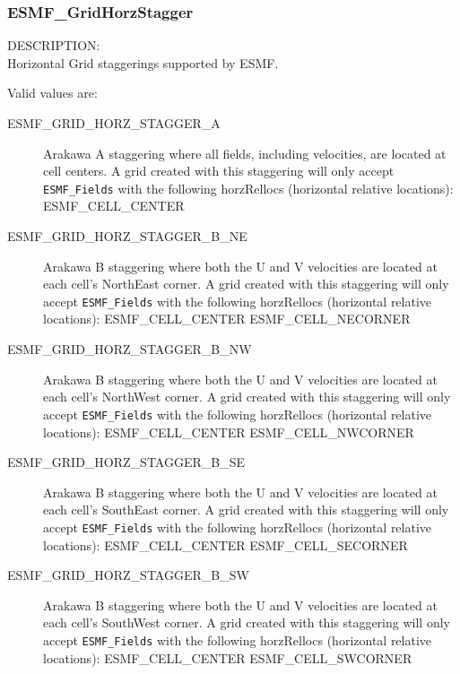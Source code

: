  \subsubsection{ESMF\_GridHorzStagger}

 {\sf DESCRIPTION:\\}
 Horizontal Grid staggerings supported by ESMF.

 Valid values are:
 \begin{description}
    \item [ESMF\_GRID\_HORZ\_STAGGER\_A]
          Arakawa A staggering where all fields, including velocities, are
          located at cell centers.  A grid created with this staggering will
          only accept {\tt ESMF\_Fields} with the following horzRellocs
          (horizontal relative locations):
              ESMF\_CELL\_CENTER

    \item [ESMF\_GRID\_HORZ\_STAGGER\_B\_NE]
          Arakawa B staggering where both the U and V velocities are located at
          each cell's NorthEast corner.  A grid created with this staggering will
          only accept {\tt ESMF\_Fields} with the following horzRellocs
          (horizontal relative locations):
              ESMF\_CELL\_CENTER
              ESMF\_CELL\_NECORNER

    \item [ESMF\_GRID\_HORZ\_STAGGER\_B\_NW]
          Arakawa B staggering where both the U and V velocities are located at
          each cell's NorthWest corner.  A grid created with this staggering will
          only accept {\tt ESMF\_Fields} with the following horzRellocs
          (horizontal relative locations):
              ESMF\_CELL\_CENTER
              ESMF\_CELL\_NWCORNER
 
    \item [ESMF\_GRID\_HORZ\_STAGGER\_B\_SE]
          Arakawa B staggering where both the U and V velocities are located at
          each cell's SouthEast corner.  A grid created with this staggering will
          only accept {\tt ESMF\_Fields} with the following horzRellocs
          (horizontal relative locations):
              ESMF\_CELL\_CENTER
              ESMF\_CELL\_SECORNER

    \item [ESMF\_GRID\_HORZ\_STAGGER\_B\_SW]
          Arakawa B staggering where both the U and V velocities are located at
          each cell's SouthWest corner.  A grid created with this staggering will
          only accept {\tt ESMF\_Fields} with the following horzRellocs
          (horizontal relative locations):
              ESMF\_CELL\_CENTER
              ESMF\_CELL\_SWCORNER


\end{description}
